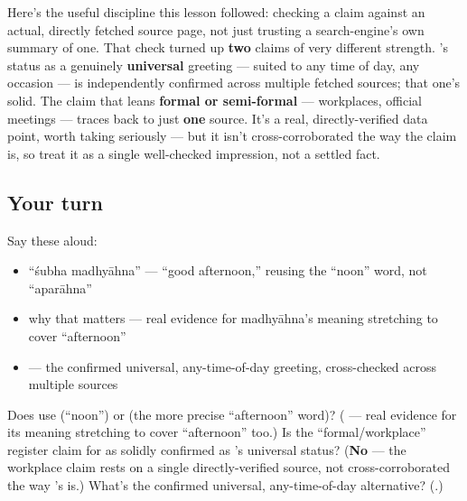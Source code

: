 \begin{culture}
Here's the useful discipline this lesson followed: checking a claim against an actual, directly fetched source page, not just trusting a search-engine's own summary of one. That check turned up \textbf{two} claims of very different strength. \textbf{}'s status as a genuinely \textbf{universal} greeting — suited to any time of day, any occasion — is independently confirmed across multiple fetched sources; that one's solid. The claim that \textbf{ } leans \textbf{formal or semi-formal} — workplaces, official meetings — traces back to just \textbf{one} source. It's a real, directly-verified data point, worth taking seriously — but it isn't cross-corroborated the way the  claim is, so treat it as a single well-checked impression, not a settled fact.
\end{culture}

\subsection*{Your turn}
Say these aloud:

\begin{itemize}
\raggedright
  \item \textquotedblleft{}śubha madhyāhna\textquotedblright{} — \textquotedblleft{}good afternoon,\textquotedblright{} reusing the \textquotedblleft{}noon\textquotedblright{} word, not \textquotedblleft{}aparāhna\textquotedblright{}
  \item why that matters — real evidence for madhyāhna's meaning stretching to cover \textquotedblleft{}afternoon\textquotedblright{}
  \item {} — the confirmed universal, any-time-of-day greeting, cross-checked across multiple sources
\end{itemize}

\begin{tcolorbox}[breakable,colback=teal!4,colframe=teal!35!black,title={Before you move on}]
Does   use  (\textquotedblleft{}noon\textquotedblright{}) or  (the more precise \textquotedblleft{}afternoon\textquotedblright{} word)? (\textbf{} — real evidence for its meaning stretching to cover \textquotedblleft{}afternoon\textquotedblright{} too.) Is the \textquotedblleft{}formal/workplace\textquotedblright{} register claim for   as solidly confirmed as 's universal status? (\textbf{No} — the workplace claim rests on a single directly-verified source, not cross-corroborated the way 's is.) What's the confirmed universal, any-time-of-day alternative? (\textbf{}.)
\end{tcolorbox}
